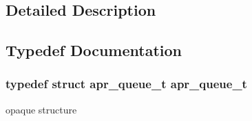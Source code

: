 \subsection{Detailed Description}


\subsection{Typedef Documentation}
\hypertarget{group___a_p_r___util___f_i_f_o_ga8c74c22abf47b63555a2109b06f83abb}{
\subsubsection[{apr\-\_\-queue\-\_\-t}]{\setlength{\rightskip}{0pt plus 5cm}typedef struct {\bf apr\-\_\-queue\-\_\-t} {\bf apr\-\_\-queue\-\_\-t}}}\label{group___a_p_r___util___f_i_f_o_ga8c74c22abf47b63555a2109b06f83abb}
opaque structure 


